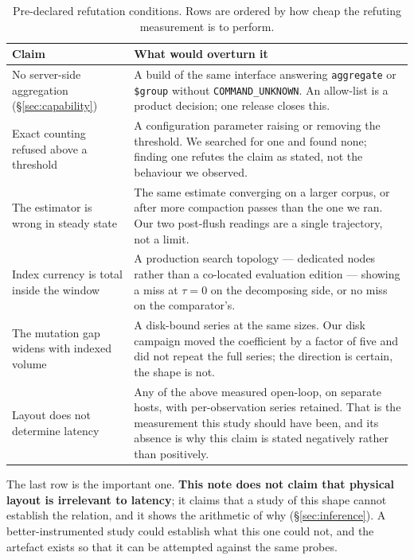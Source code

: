 \documentclass[11pt,a4paper]{article}
\newcommand{\code}[1]{\texttt{\small #1}}
\begin{document}
\begin{table}[htbp]
\centering
\small
\caption{Pre-declared refutation conditions. Rows are ordered by how cheap the refuting measurement
is to perform.}
\label{tab:falsify}
\begin{tabular}{p{4.3cm}p{9.8cm}}
\toprule
\textbf{Claim} & \textbf{What would overturn it} \\
\midrule
No server-side aggregation (\S\ref{sec:capability}) &
A build of the same interface answering \code{aggregate} or \code{\$group} without
\code{COMMAND\_UNKNOWN}. An allow-list is a product decision; one release closes this. \\
Exact counting refused above a threshold &
A configuration parameter raising or removing the threshold. We searched for one and found none;
finding one refutes the claim as stated, not the behaviour we observed. \\
The estimator is wrong in steady state &
The same estimate converging on a larger corpus, or after more compaction passes than the one we
ran. Our two post-flush readings are a single trajectory, not a limit. \\
Index currency is total inside the window &
A production search topology --- dedicated nodes rather than a co-located evaluation edition ---
showing a miss at $\tau = 0$ on the decomposing side, or no miss on the comparator's. \\
The mutation gap widens with indexed volume &
A disk-bound series at the same sizes. Our disk campaign moved the coefficient by a factor of five
and did not repeat the full series; the direction is certain, the shape is not. \\
Layout does not determine latency &
Any of the above measured open-loop, on separate hosts, with per-observation series retained. That
is the measurement this study should have been, and its absence is why this claim is stated
negatively rather than positively. \\
\bottomrule
\end{tabular}
\end{table}

The last row is the important one. \textbf{This note does not claim that physical layout is
irrelevant to latency}; it claims that a study of this shape cannot establish the relation, and it
shows the arithmetic of why (\S\ref{sec:inference}). A better-instrumented study could establish
what this one could not, and the artefact exists so that it can be attempted against the same
probes.
\end{document}
